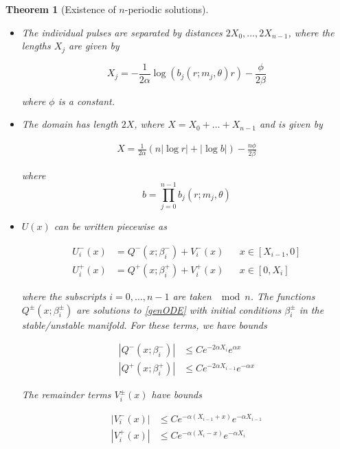 \documentclass[12pt]{article}
\newtheorem{theorem}{Theorem}
\begin{document}
\begin{theorem}[Existence of $n$-periodic solutions]
\begin{itemize}
where $\theta^*_j$ depends on $\theta$, $\theta_j^* \in [-\arctan \rho,\pi - \arctan \rho)$, and we have bound
\begin{align}
|\theta^*_j| \leq C e^{ -\frac{\pi}{\rho} (m_{n-1} - m_j) }
\end{align}

For all $\theta$ and for $j = 0, \dots, n-2$,

\begin{align}
|b^*_j(m_j, \theta) - b_j^0| \leq C e^{ -\frac{\pi}{\rho} (m_{n-1} - m_k) }
\end{align}

\item The individual pulses are separated by distances $2 X_0, \dots, 2 X_{n-1}$, where the lengths $X_j$ are given by 

\begin{equation}\label{Xj}
X_j = -\frac{1}{2\alpha}\log(b_j(r; m_j, \theta) r) - \frac{\phi}{2 \beta} 
\end{equation}

where $\phi$ is a constant.

\item The domain has length $2X$, where $X = X_0 + \dots + X_{n-1}$ and is given by

\begin{align}
X = \frac{1}{2\alpha} (n |\log r| + |\log b| ) - \frac{n \phi}{2 \beta}
\end{align}

where 
\begin{equation}
b = \prod_{j=0}^{n-1} b_j(r; m_j, \theta)
\end{equation}

\item $U(x)$ can be written piecewise as

\begin{align}
U_i^-(x) &= Q^-(x; \beta_i^-) + V_i^-(x) && x \in [X_{i-1}, 0] \\
U_i^+(x) &= Q^+(x; \beta_i^+) + V_i^+(x) && x \in [0, X_i]
\end{align}

where the subscripts $i = 0, \dots, n-1$ are taken $\mod n$. The functions $Q^\pm(x; \beta_i^\pm)$ are solutions to \eqref{genODE} with initial conditions $\beta_i^\pm$ in the stable/unstable manifold. For these terms, we have bounds

\begin{align*}
|Q^-(x; \beta_i^-)| &\leq C e^{-2 \alpha X_i} e^{\alpha x} \\
|Q^+(x; \beta_i^+)| &\leq C e^{-2 \alpha X_{i-1}} e^{-\alpha x}
\end{align*} 

The remainder terms $V_i^\pm(x)$ have bounds

\begin{align}
|V_i^-(x)| &\leq C e^{-\alpha(X_{i-1} + x)}e^{-\alpha X_{i-1}} \\
|V_i^+(x)| &\leq C e^{-\alpha(X_i - x)}e^{-\alpha X_i} 
\end{align} 

\end{itemize}
\end{theorem}
\end{document}
